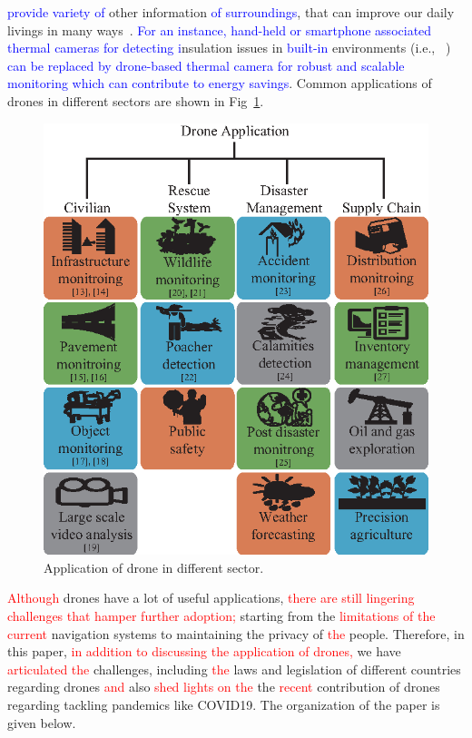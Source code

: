 \textcolor{blue}{provide variety of} other information \textcolor{blue}{of surroundings}, that can improve our daily livings in many ways~\cite{roy2015aarpa, pathak2015acoustic}. \textcolor{blue}{For an instance, hand-held or smartphone associated thermal cameras for detecting i}nsulation issues in 
\textcolor{blue}{built-in} environments 
(i.e., ~\cite{khan2019detecting, khan2015demo, khan2020temporal}) \textcolor{blue}{ can be replaced by drone-based thermal camera for robust and scalable monitoring which can contribute to energy savings}. Common applications of drones in different sectors are shown in Fig~\ref{applicaitonfig}.


\begin{figure}[h!]
\centering
\includegraphics[width=.85\linewidth]{figure/applicaitonfig.eps}
\caption{Application of drone in different sector.}
\label{applicaitonfig}
\end{figure}
%

\textcolor{red}{Although} drones have a lot of useful applications, 
\textcolor{red}{there are still lingering challenges that hamper further adoption; }
starting from the \textcolor{red}{limitations of the current} navigation systems to maintaining the privacy of \textcolor{red}{the} people. Therefore, in this paper, 
\textcolor{red}{in addition to discussing the application of drones,}
we have \textcolor{red}{articulated the} challenges, including \textcolor{red}{the} laws and legislation of different countries regarding drones \textcolor{red}{and} also \textcolor{red}{shed lights on the} the \textcolor{red}{recent} contribution of drones regarding tackling pandemics like COVID19. The organization of the paper is given below.

